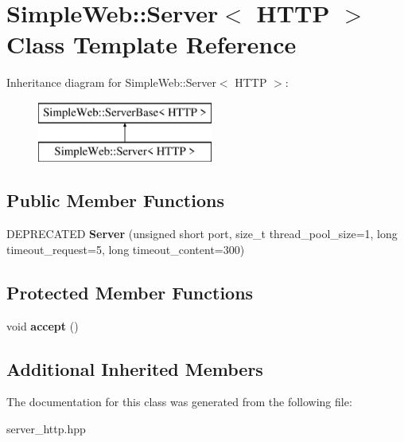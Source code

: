 \hypertarget{a01960}{}\section{Simple\+Web\+:\+:Server$<$ H\+T\+TP $>$ Class Template Reference}
\label{a01960}
Inheritance diagram for Simple\+Web\+:\+:Server$<$ H\+T\+TP $>$\+:\begin{figure}[H]
\begin{center}
\leavevmode
\includegraphics[height=2.000000cm]{a01960}
\end{center}
\end{figure}
\subsection*{Public Member Functions}
\begin{DoxyCompactItemize}
\item 
\mbox{\label{a01960_a926e5ebedafc2d17a944698197b7f002}} 
D\+E\+P\+R\+E\+C\+A\+T\+ED {\bfseries Server} (unsigned short port, size\+\_\+t thread\+\_\+pool\+\_\+size=1, long timeout\+\_\+request=5, long timeout\+\_\+content=300)
\end{DoxyCompactItemize}
\subsection*{Protected Member Functions}
\begin{DoxyCompactItemize}
\item 
\mbox{\label{a01960_abe9f9de361dcb01541e0302eac21986d}} 
void {\bfseries accept} ()
\end{DoxyCompactItemize}
\subsection*{Additional Inherited Members}


The documentation for this class was generated from the following file\+:\begin{DoxyCompactItemize}
\item 
server\+\_\+http.\+hpp\end{DoxyCompactItemize}
